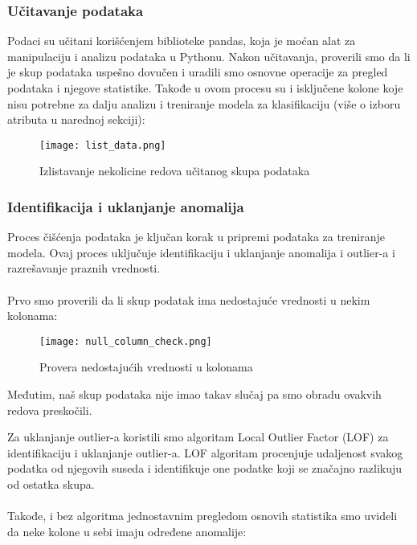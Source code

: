 \documentclass[a4paper,12pt]{article}
\begin{document}
\subsubsection{Učitavanje podataka}
Podaci su učitani korišćenjem biblioteke pandas, koja je moćan alat za manipulaciju i analizu podataka u Pythonu. Nakon učitavanja, proverili smo da li je skup podataka uspešno dovučen i uradili smo osnovne operacije za pregled podataka i njegove statistike. Takođe u ovom procesu su i isključene kolone koje nisu potrebne za dalju analizu i treniranje modela za klasifikaciju (više o izboru atributa u narednoj sekciji):

\begin{figure}[h!]
\centering
\texttt{[image: list\_data.png]}
\caption{Izlistavanje nekolicine redova učitanog skupa podataka}
\label{fig:sql_query}
\end{figure}

\clearpage

\subsubsection{Identifikacija i uklanjanje anomalija}
Proces čišćenja podataka je ključan korak u pripremi podataka za treniranje modela. Ovaj proces uključuje identifikaciju i uklanjanje anomalija i outlier-a i razrešavanje praznih vrednosti.\\\\
Prvo smo proverili da li skup podatak ima nedostajuće vrednosti u nekim kolonama:

\begin{figure}[h!]
\centering
\texttt{[image: null\_column\_check.png]}
\caption{Provera nedostajućih vrednosti u kolonama}
\label{fig:sql_query}
\end{figure}

Međutim, naš skup podataka nije imao takav slučaj pa smo obradu ovakvih redova preskočili.

\clearpage
Za uklanjanje outlier-a koristili smo algoritam Local Outlier Factor (LOF) za identifikaciju i uklanjanje outlier-a. LOF algoritam procenjuje udaljenost svakog podatka od njegovih suseda i identifikuje one podatke koji se značajno razlikuju od ostatka skupa.\\\\
Takođe, i bez algoritma jednostavnim pregledom osnovih statistika smo uvideli da neke kolone u sebi imaju određene anomalije:\\\\
\end{document}
